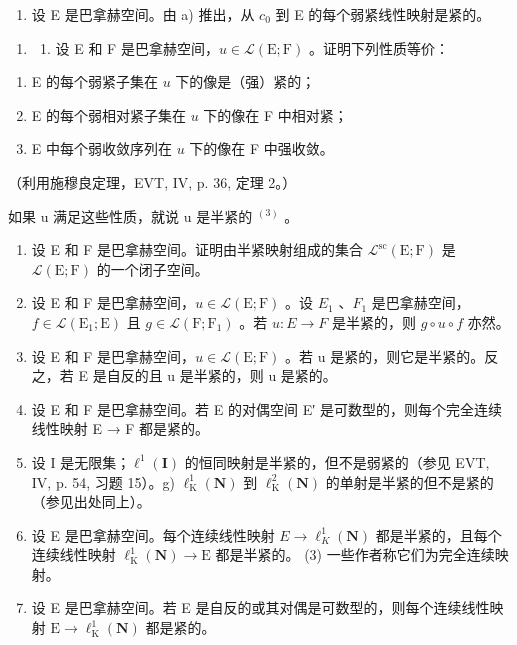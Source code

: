 \begin{enumerate}
\def\labelenumi{\alph{enumi})}
\setcounter{enumi}{1}
\tightlist
\item
  设 E 是巴拿赫空间。由 a) 推出，从 \(c_{0}\) 到 E 的每个弱紧线性映射是紧的。
\end{enumerate}

\begin{enumerate}
\def\labelenumi{\arabic{enumi})}
\setcounter{enumi}{29}
\tightlist
\item
  \begin{enumerate}
  \def\labelenumii{\alph{enumii})}
  \tightlist
  \item
    设 E 和 F 是巴拿赫空间，\(u \in \mathcal{L}(\mathrm{E};\mathrm{F})\) 。证明下列性质等价：
  \end{enumerate}
\end{enumerate}

\begin{enumerate}
\def\labelenumi{(\roman{enumi})}
\item
  E 的每个弱紧子集在 \(u\) 下的像是（强）紧的；
\item
  E 的每个弱相对紧子集在 \(u\) 下的像在 F 中相对紧；
\item
  E 中每个弱收敛序列在 \(u\) 下的像在 F 中强收敛。
\end{enumerate}

（利用施穆良定理，EVT, IV, p. 36, 定理 2。）

如果 u 满足这些性质，就说 u 是半紧的 \(^{(3)}\) 。

\begin{enumerate}
\def\labelenumi{\alph{enumi})}
\setcounter{enumi}{1}
\item
  设 E 和 F 是巴拿赫空间。证明由半紧映射组成的集合 \(\mathcal{L}^{\mathrm{sc}}(\mathrm{E};\mathrm{F})\) 是 \(\mathcal{L}(\mathrm{E};\mathrm{F})\) 的一个闭子空间。
\item
  设 E 和 F 是巴拿赫空间，\(u \in \mathcal{L}(\mathrm{E};\mathrm{F})\) 。设 \(E_{1}\) 、\(F_{1}\) 是巴拿赫空间，\(f \in \mathcal{L}(\mathrm{E}_{1};\mathrm{E})\) 且 \(g \in \mathcal{L}(\mathrm{F};\mathrm{F}_{1})\) 。若 \(u: E \to F\) 是半紧的，则 \(g \circ u \circ f\) 亦然。
\item
  设 E 和 F 是巴拿赫空间，\(u \in \mathcal{L}(\mathrm{E};\mathrm{F})\) 。若 u 是紧的，则它是半紧的。反之，若 E 是自反的且 u 是半紧的，则 u 是紧的。
\item
  设 E 和 F 是巴拿赫空间。若 E 的对偶空间 E′ 是可数型的，则每个完全连续线性映射 E → F 都是紧的。
\item
  设 I 是无限集；\(\ell^{1}(\mathbf{I})\) 的恒同映射是半紧的，但不是弱紧的（参见 EVT, IV, p. 54, 习题 15）。g) \(\ell_{\mathrm{K}}^{1}(\mathbf{N})\) 到 \(\ell_{\mathrm{K}}^{2}(\mathbf{N})\) 的单射是半紧的但不是紧的（参见出处同上）。
\item
  设 E 是巴拿赫空间。每个连续线性映射 \(E \rightarrow \ell_{K}^{1}(\mathbf{N})\) 都是半紧的，且每个连续线性映射 \(\ell_{\mathrm{K}}^{1}(\mathbf{N}) \rightarrow \mathrm{E}\) 都是半紧的。
(3) 一些作者称它们为完全连续映射。
\item
  设 E 是巴拿赫空间。若 E 是自反的或其对偶是可数型的，则每个连续线性映射 \(\mathrm{E} \to \ell_{\mathrm{K}}^{1}(\mathbf{N})\) 都是紧的。
\end{enumerate}

